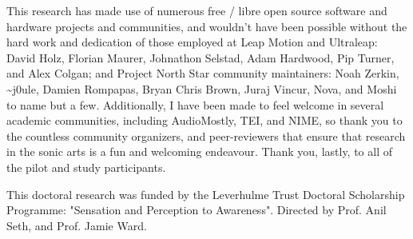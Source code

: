 This research has made use of numerous free / libre open source software and hardware projects and communities, and wouldn't have been possible without the hard work and dedication of those employed at Leap Motion and Ultraleap: David Holz, Florian Maurer, Johnathon Selstad, Adam Hardwood, Pip Turner, and Alex Colgan; and Project North Star community maintainers: Noah Zerkin, \textasciitilde{}j0ule, Damien Rompapas, Bryan Chris Brown, Juraj Vincur, Nova, and Moshi to name but a few. Additionally, I have been made to feel welcome in several academic communities, including AudioMostly, TEI, and NIME, so thank you to the countless community organizers, and peer-reviewers that ensure that research in the sonic arts is a fun and welcoming endeavour. Thank you, lastly, to all of the pilot and study participants.

This doctoral research was funded by the Leverhulme Trust Doctoral Scholarship Programme: "Sensation and Perception to Awareness". Directed by Prof. Anil Seth, and Prof. Jamie Ward.
